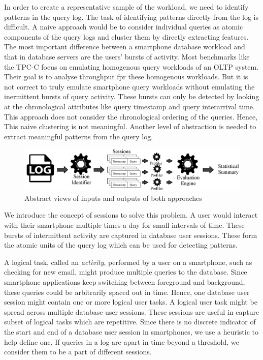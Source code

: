 In order to create a representative sample of the workload, we need to identify patterns in the query log. The task of identifying patterns directly from the log is difficult. A naive approach would be to consider individual queries as atomic components of the query logs and cluster them by directly extracting features. The most important difference between a smartphone database workload and that in database servers are the users' bursts of activity. Most benchmarks like the TPC-C focus on emulating homogenous query workloads of an OLTP system. Their goal is to analyse throughput fpr these homogenous workloads. But it is not correct to truly emulate smartphone query workloads without emulating the inermittent bursts of query activity. These bursts can only be detected by looking at the chronological attributes like query timestamp and query interarrival time. This approach does not consider the chronological ordering of the queries. Hence, This naive clustering is not meaningful. Another level of abstraction is needed to extract meaningful patterns from the query log.

\begin{figure}[h!]
    \centering
    \includegraphics[width=\textwidth]{graphics/approach}
    \caption{Abstract views of inputs and outputs of both approaches}
    \label{fig:approaches}
\end{figure}

We introduce the concept of sessions to solve this problem. A user would interact with their smartphone multiple times a day for small intervals of time. These bursts of intermittent activity are captured in database user sessions. These form the atomic units of the query log which can be used for detecting patterns. 

A logical task, called an \emph{activity}, performed by a user on a smartphone, such as checking for new email, might produce multiple queries to the database. Since smartphone applications keep switching between foreground and background, these queries could be arbitrarily spaced out in time. Hence, one database user session might contain one or more logical user tasks. A logical user task might be spread across multiple database user sessions. These sessions are useful in capture subset of logical tasks which are repetitive. Since there is no discrete indicator of the start and end of a database user session in smartphones, we use a heuristic to help define one. If queries in a log are apart in time beyond a threshold, we consider them to be a part of different sessions.

